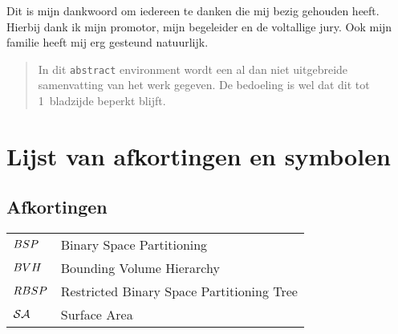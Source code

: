 \documentclass[master=cws,masteroption=mmc]{kulemt}
\begin{document}
\begin{preface}
  Dit is mijn dankwoord om iedereen te danken die mij bezig gehouden heeft.
  Hierbij dank ik mijn promotor, mijn begeleider en de voltallige jury.
  Ook mijn familie heeft mij erg gesteund natuurlijk.
\end{preface}

\tableofcontents*

\begin{abstract}
  In dit \texttt{abstract} environment wordt een al dan niet uitgebreide
  samenvatting van het werk gegeven. De bedoeling is wel dat dit tot
  1~bladzijde beperkt blijft.

  \lipsum[1]
\end{abstract}

\listoffiguresandtables
\chapter{Lijst van afkortingen en symbolen}
\section*{Afkortingen}
\begin{flushleft}
  \renewcommand{\arraystretch}{1.1}
  \begin{tabularx}{\textwidth}{@{}p{20mm}X@{}}
    $BSP$ & Binary Space Partitioning \\
    $BVH$ & Bounding Volume Hierarchy \\
    $RBSP$ & Restricted Binary Space Partitioning Tree \\
    $\mathcal{SA}$   & Surface Area \\
  \end{tabularx}
\end{flushleft}
\end{document}
